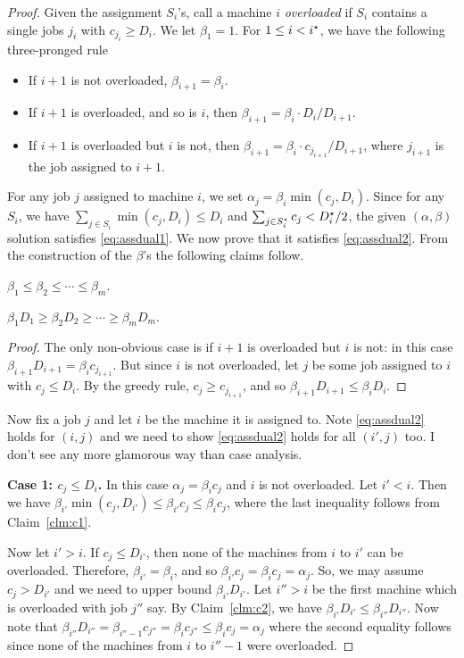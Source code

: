 \documentclass{article}[11pt]
\begin{document}
\begin{proof}
Given the assignment $S_i$'s, call a machine $i$ {\em overloaded} if $S_i$ contains a single jobs $j_i$ with $c_{j_i} \geq D_i$. 
We let $\beta_1 = 1$. For $1\leq i <i^\star$, we have the following three-pronged rule
\begin{itemize}[noitemsep]
	\item If $i+1$ is not overloaded, $\beta_{i+1} = \beta_i$.
	\item If $i+1$ is overloaded, and so is $i$, then $\beta_{i+1} = \beta_i \cdot D_i/D_{i+1}$.
	\item If $i+1$ is overloaded but $i$ is not, then $\beta_{i+1} = \beta_i \cdot c_{j_{i+1}}/D_{i+1}$, where $j_{i+1}$ is the job assigned to $i+1$.
\end{itemize}
For any job $j$ assigned to machine $i$, we set $\alpha_j = \beta_i \min(c_j,D_i)$. Since for any $S_i$, we have $\sum_{j\in S_i} \min(c_j,D_i) \leq D_i$ and $\sum_{j\in S_i^\star} c_j < D_i^\star/2$,  the given $(\alpha,\beta)$ solution satisfies \eqref{eq:assdual1}. We now prove that it satisfies \eqref{eq:assdual2}.
From the construction of the $\beta$'s the following claims follow.
\begin{claim}\label{clm:c1}
$\beta_1\leq \beta_2 \leq \cdots \leq \beta_m$.
\end{claim}
\begin{claim}\label{clm:c2}
$\beta_1D_1 \geq \beta_2D_2 \geq \cdots \geq \beta_mD_m$.
\end{claim}
\begin{proof}
	The only non-obvious case is if $i+1$ is overloaded but $i$ is not: in this case $\beta_{i+1}D_{i+1} = \beta_ic_{j_{i+1}}$. But since $i$ is not overloaded, let $j$ be some job assigned to $i$ with $c_j \leq D_i$.
	By the greedy rule, $c_j \geq c_{j_{i+1}}$, and so $\beta_{i+1}D_{i+1} \leq \beta_iD_i$.
\end{proof}
\noindent
Now fix a job $j$ and let $i$ be the machine it is assigned to. Note \eqref{eq:assdual2} holds for $(i,j)$ and we need to show \eqref{eq:assdual2} holds for all $(i',j)$ too.
I don't see any more glamorous way than case analysis. \smallskip

\noindent
{\bf Case 1: $c_j \leq D_i$.} In this case $\alpha_j = \beta_ic_j$ and $i$ is not overloaded. 
Let $i' < i$.  Then we have $\beta_{i'}\min(c_j,D_{i'}) \le \beta_{i'}c_j \leq \beta_ic_j$, where the last inequality follows from Claim~\ref{clm:c1}.

Now let $i' > i$. If $c_j \leq D_{i'}$, then none of the machines from $i$ to $i'$ can be overloaded. Therefore, $\beta_{i'} = \beta_i$, and so $\beta_{i'}c_j = \beta_ic_j = \alpha_j$.
So, we may assume $c_j > D_{i'}$ and we need to upper bound $\beta_{i'}D_{i'}$. Let $i'' > i$ be the first machine which is overloaded with job $j''$ say.
By Claim~\ref{clm:c2}, we have $\beta_{i'}D_{i'} \leq \beta_{i''}D_{i''}$. Now note that
$\beta_{i''}D_{i''}  = \beta_{i''-1}c_{j''} = \beta_ic_{j''} \leq \beta_ic_j = \alpha_j$ where the second equality follows since none of the machines from $i$ to $i''-1$ were overloaded. \smallskip


\end{proof}
\end{document}
